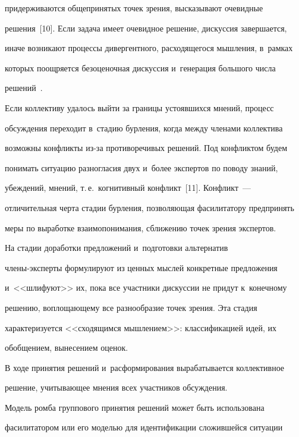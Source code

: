придерживаются общепринятых точек зрения, высказывают очевидные 


решения~[10]. Если задача имеет очевидное решение, дискуссия завершается, 


иначе возникают процессы дивергентного, расходящегося мышления, в~рамках 


которых поощряется безоценочная дискуссия и~генерация большого числа 


решений~\cite{5-kl}. 


  


  Если коллективу удалось выйти за границы устоявшихся мнений, процесс 


обсуждения переходит в~стадию бурления, когда между членами коллектива 


возможны конфликты из-за противоречивых решений. Под конфликтом будем 


понимать ситуацию разногласия двух и~более экспертов по поводу знаний, 


убеждений, мнений, т.\,е.\ когнитивный конфликт~[11]. Конфликт~--- 


отличительная черта стадии бурления, позволяющая фасилитатору предпринять 


меры по выработке взаимопонимания, сближению точек зрения экспертов.


  


  На стадии доработки предложений и~подготовки альтернатив  


чле\-ны-экс\-пер\-ты формулируют из ценных мыслей конкретные предложения 


и~<<шлифуют>> их, пока все участники дискуссии не придут к~конечному 


решению, воплощающему все разнообразие точек зрения. Эта стадия 


характеризуется <<сходящимся мышлением>>: классификацией идей, их 


обобщением, вынесением оценок. 


  


  В ходе принятия решений и~расформирования вырабатывается коллективное 


решение, учитывающее мнения всех участников обсуждения. 


  


  Модель ромба группового принятия решений может быть использована 


фасилитатором или его моделью для идентификации сложившейся ситуации 


